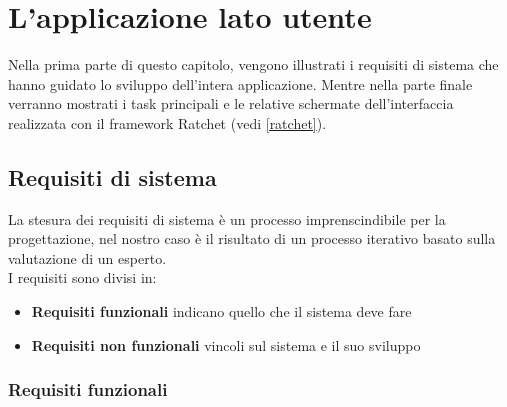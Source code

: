 \chapter{L'applicazione lato utente}
Nella prima parte di questo capitolo, vengono illustrati i requisiti di sistema che hanno guidato lo sviluppo dell'intera applicazione. Mentre nella parte finale verranno mostrati i task principali e le relative schermate dell'interfaccia realizzata con il framework Ratchet (vedi \ref{ratchet}).
\section{Requisiti di sistema}
La stesura dei requisiti di sistema è un processo imprenscindibile per la progettazione, nel nostro caso è il risultato di un processo iterativo basato sulla valutazione di un esperto.\\
I requisiti sono divisi in:
\begin{itemize}
\item \textbf{Requisiti funzionali} indicano quello che il sistema deve fare
\item \textbf{Requisiti non funzionali} vincoli sul sistema e il suo sviluppo
\end{itemize}
 
 \subsection{Requisiti funzionali}

